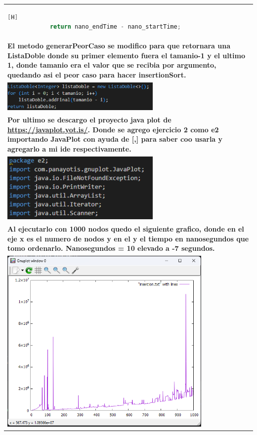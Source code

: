\documentclass[9pt]{article}
\begin{document}
\begin{longtable}{|p{15cm}|}
		\begin{lstlisting}[language=Java,caption={Retorno de insertionSort}][H]
			return nano_endTime - nano_startTime;
		\end{lstlisting}\\
		\textbf{El metodo generarPeorCaso se modifico para que retornara una ListaDoble donde su
			primer elemento fuera el tamanio-1 y el ultimo 1, donde tamanio era el valor que 
			se recibia por argumento, quedando asi el peor caso para hacer insertionSort.}\\
		\includegraphics[width=0.6\textwidth,keepaspectratio]{img/generador.png}\\
		\textbf{Por ultimo se descargo el proyecto java plot de \url{https://javaplot.yot.is/}.
			Donde se agrego ejercicio 2 como e2 importando JavaPlot con ayuda de [,] para
			saber coo usarla y agregarlo a mi ide respectivamente.}\\
		\includegraphics[width=0.6\textwidth,keepaspectratio]{img/importaciones.png}\\
		\textbf{Al ejecutarlo con 1000 nodos quedo el siguiente grafico, donde en el
			eje x es el numero de nodos y en el y el tiempo en nanosegundos que tomo ordenarlo.
			Nanosegundos = 10 elevado a -7 segundos.}\\
		\includegraphics[width=0.8\textwidth,keepaspectratio]{img/plot.png}\\

\end{longtable}
\end{document}
